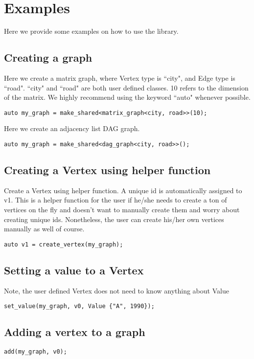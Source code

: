 \documentclass{article}
\begin{document}
\section{Examples}
Here we provide some examples on how to use the library. 
\subsection{Creating a graph}
Here we create a matrix graph, where Vertex type is ``city", and Edge type is ``road". ``city" and ``road" are both user defined classes. 10 refers to the dimension of the matrix. We highly recommend using the keyword ``auto" whenever possible.
\begin{lstlisting}
auto my_graph = make_shared<matrix_graph<city, road>>(10);
\end{lstlisting}
Here we create an adjacency list DAG graph.
\begin{lstlisting}
auto my_graph = make_shared<dag_graph<city, road>>();
\end{lstlisting}

\subsection{Creating a Vertex using helper function}
Create a Vertex using helper function. A unique id is automatically assigned to v1. This is a helper function for the user if he/she needs to create a ton of vertices on the fly and doesn't want to manually create them and worry about creating unique ids. Nonetheless, the user can create his/her own vertices manually as well of course. 
\begin{lstlisting}
auto v1 = create_vertex(my_graph);
\end{lstlisting}

\subsection{Setting a value to a Vertex}
Note, the user defined Vertex does not need to know anything about Value
\begin{lstlisting}
set_value(my_graph, v0, Value {"A", 1990});
\end{lstlisting}

\subsection{Adding a vertex to a graph}
\begin{lstlisting}
add(my_graph, v0);
\end{lstlisting}
\end{document}
